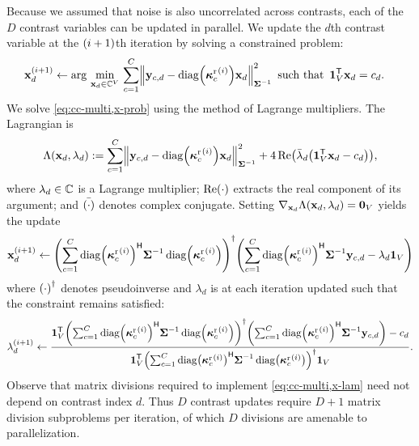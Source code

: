 Because we assumed 
that noise is also uncorrelated across contrasts,
each of the $D$ contrast variables
can be updated in parallel.
We update the $d$th contrast variable
at the $\paren{i+1}$th iteration
by solving a constrained problem:
\begin{align}
	\iter{\bmx}{i+1}_d &\gets
		\argmin{\bmx_d\in\complexes{V}}
		\sum_{c=1}^C \norm{\bmy_{c,d}-\diag{\iter{\bmsrx_c}{i}}\bmx_d}^2_{\bmSig^{-1}} \,\,\,
		\mathrm{such\,\,that} \,\,\,
		\ones{V}\tpose\bmx_d = \const{d}.
	\label{eq:cc-multi,x-prob}
\end{align}
We solve \eqref{eq:cc-multi,x-prob}
using the method of Lagrange multipliers.
The Lagrangian is
\begin{align}
	\Lambda\paren{\bmx_d,\lambda_d} :=
		\sum_{c=1}^C \norm{\bmy_{c,d}-\diag{\iter{\bmsrx_c}{i}}\bmx_d}^2_{\bmSig^{-1}}
		+ 4 \re{\bar{\lambda}_d \paren{\ones{V}\tpose\bmx_d-\const{d}}},
	\label{eq:cc-multi,x-lagrangian}
\end{align}
where $\lambda_d\in\mathbb{C}$ is a Lagrange multiplier;
$\re{\cdot}$ extracts the real component of its argument;
and $\bar{\paren{\cdot}}$ denotes complex conjugate.
Setting $\grada{\bmx_d}{\Lambda\paren{\bmx_d,\lambda_d}} = \zeros{V}$
yields the update
\begin{align}
	\iter{\bmx}{i+1}_d \gets
		\pinv{%
			\sum_{c=1}^C \diag{\iter{\bmsrx_c}{i}}\ctpose 
				\bmSig^{-1} \diag{\iter{\bmsrx_c}{i}}
		}%
		\paren{%
			\sum_{c=1}^C \diag{\iter{\bmsrx_c}{i}}\ctpose \bmSig^{-1} \bmy_{c,d}
			- \lambda_d \ones{V}
		}%
	\label{eq:cc-multi,x-update}
\end{align}
where $\pinv{\cdot}$ denotes pseudoinverse
and $\lambda_d$ is at each iteration updated
such that the constraint remains satisfied: 
\begin{align}
	\iter{\lambda}{i+1}_d \gets \frac{%
		\ones{V}\tpose \pinv{%
			\sum_{c=1}^C \diag{\iter{\bmsrx_c}{i}}\ctpose \bmSig^{-1} \diag{\iter{\bmsrx_c}{i}}
		}%
		\paren{%
			\sum_{c=1}^C \diag{\iter{\bmsrx_c}{i}}\ctpose \bmSig^{-1} \bmy_{c,d}
		}%
		- \const{d}
	}{%
		\ones{V}\tpose \pinv{%
			\sum_{c=1}^C \diag{\iter{\bmsrx_c}{i}}\ctpose 
				\bmSig^{-1} \diag{\iter{\bmsrx_c}{i}}
		}%
		\ones{V}
	}.
	\label{eq:cc-multi,x-lam}
\end{align}
Observe that matrix divisions 
required to implement \eqref{eq:cc-multi,x-lam}
need not depend on contrast index $d$.
Thus $D$ contrast updates 
require $D+1$ matrix division subproblems per iteration,
of which $D$ divisions are amenable to parallelization.

